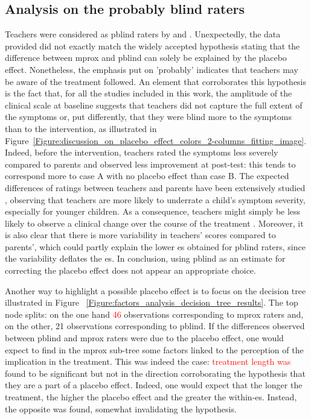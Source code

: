 \subsection{Analysis on the probably blind raters}

Teachers were considered as \gls{pblind} raters by \citeauthor{Cortese2016} and \citeauthor{Micoulaud2014}.
Unexpectedly, the data provided did not exactly match the widely accepted hypothesis stating that the difference between
\gls{mprox} and \gls{pblind} can solely be explained by the placebo effect. 
Nonetheless, the emphasis put on 'probably' indicates that teachers may be aware of the treatment followed. 
An element that corroborates this hypothesis is the fact that, for all the studies included in this work, the amplitude 
of the clinical scale at baseline suggests that teachers did not capture the full extent of the symptoms or, put differently, 
that they were blind more to the symptoms than to the intervention, as illustrated 
in Figure~\ref{Figure:discussion_on_placebo_effect_colors_2-columns_fitting_image}. 
Indeed, before the intervention, teachers rated the symptoms less severely compared to parents and observed less improvement at post-test: 
this tends to correspond more to case A with no placebo effect than case B. The expected differences of ratings between 
teachers and parents have been extensively studied \citep{Sollie2013, Narad2015, Minder2018}, observing that teachers are more 
likely to underrate a child's symptom severity, especially for younger children. As a consequence, teachers might simply be less likely 
to observe a clinical change over the course of the treatment \citep{Sollie2013, Narad2015, Minder2018}. Moreover, it is also clear 
that there is more variability in teachers' scores compared to parents', which could partly explain the lower \gls{es} obtained for 
\gls{pblind} raters, since the variability deflates the \gls{es}. In conclusion, using \gls{pblind} as an estimate for correcting the 
placebo effect does not appear an appropriate choice. 

Another way to highlight a possible placebo effect is to focus on the decision tree illustrated in Figure
~\ref{Figure:factors_analysis_decision_tree_results}.
The top node splits: on the one hand \textcolor{red}{46} observations corresponding to \gls{mprox} raters and, on the other, 
21 observations corresponding to \gls{pblind}. If the differences observed between \gls{pblind} and \gls{mprox} raters were 
due to the placebo effect, one would expect to find in the \gls{mprox} sub-tree some factors linked to the perception
of the implication in the treatment. This was indeed the case: \textcolor{red}{treatment length was} found to be significant but not in the
direction corroborating the hypothesis that they are a part of a placebo effect. Indeed, one would expect that the
longer the treatment, the higher the placebo effect and the greater the within-\gls{es}. Instead, the opposite was found, 
somewhat invalidating the hypothesis. 

